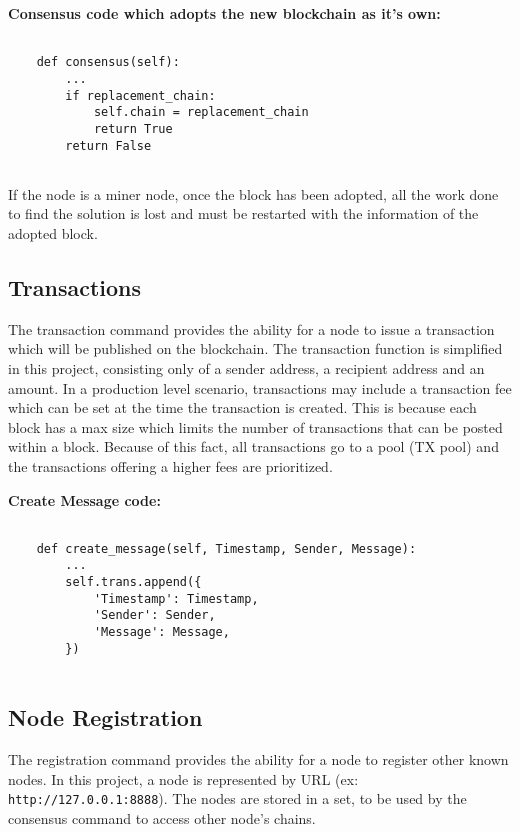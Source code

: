 \bigskip
\noindent
\textbf{Consensus code which adopts the new blockchain 
as it's own:}
\begin{footnotesize}
\begin{verbatim}

    def consensus(self):
        ...
	    if replacement_chain:
            self.chain = replacement_chain
            return True
        return False
	
\end{verbatim}
\end{footnotesize}

If the node is a miner node, once the block has been adopted, all the
work done to find the solution is lost and must be restarted with the
information of the adopted block.

\subsection{Transactions}

The transaction command provides the ability for a node to issue a
transaction which will be published on the blockchain. The transaction
function is simplified in this project, consisting only of a sender
address, a recipient address and an amount. In a production level
scenario, transactions may include a transaction fee which can be set
at the time the transaction is created. This is because each block has
a max size which limits the number of transactions that can be posted
within a block. Because of this fact, all transactions go to a pool
(TX pool) and the transactions offering a higher fees are prioritized.

\bigskip
\noindent
\textbf{Create Message code:}
\begin{footnotesize}
\begin{verbatim}

    def create_message(self, Timestamp, Sender, Message):
        ...
        self.trans.append({
            'Timestamp': Timestamp,
            'Sender': Sender,
            'Message': Message,
        })
        
\end{verbatim}
\end{footnotesize}

\subsection{Node Registration}

The registration command provides the ability for a node to register
other known nodes. In this project, a node is represented by
URL (ex: \verb|http://127.0.0.1:8888|). The nodes are stored in a set, to be
used by the consensus command to access other node's chains.

